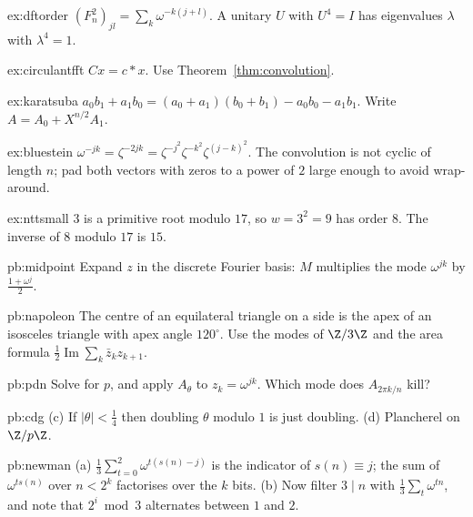 \begin{hint}{ex:dftorder}
$(F_n^2)_{jl}=\sum_k\omega^{-k(j+l)}$. A unitary $U$ with $U^4=I$ has eigenvalues $\lambda$ with $\lambda^4=1$.
\end{hint}
\begin{hint}{ex:circulantfft}
$Cx=c*x$. Use Theorem~\ref{thm:convolution}.
\end{hint}
\begin{hint}{ex:karatsuba}
$a_0b_1+a_1b_0=(a_0+a_1)(b_0+b_1)-a_0b_0-a_1b_1$. Write $A=A_0+X^{n/2}A_1$.
\end{hint}
\begin{hint}{ex:bluestein}
$\omega^{-jk}=\zeta^{-2jk}=\zeta^{-j^2}\zeta^{-k^2}\zeta^{(j-k)^2}$. The convolution is not cyclic of length $n$; pad both vectors with zeros to a power of $2$ large enough to avoid wrap-around.
\end{hint}
\begin{hint}{ex:nttsmall}
$3$ is a primitive root modulo $17$, so $w=3^2=9$ has order $8$. The inverse of $8$ modulo $17$ is $15$.
\end{hint}

\begin{hint}{pb:midpoint}
Expand $z$ in the discrete Fourier basis: $M$ multiplies the mode $\omega^{jk}$ by $\frac{1+\omega^j}2$.
\end{hint}

\begin{hint}{pb:napoleon}
The centre of an equilateral triangle on a side is the apex of an isosceles triangle with apex angle $120^\circ$. Use the
modes of $\Z/3\Z$ and the area formula $\frac12\operatorname{Im}\sum_k\bar z_kz_{k+1}$.
\end{hint}

\begin{hint}{pb:pdn}
Solve for $p$, and apply $A_\theta$ to $z_k=\omega^{jk}$. Which mode does $A_{2\pi k/n}$ kill?
\end{hint}

\begin{hint}{pb:cdg}
(c) If $|\theta|<\frac14$ then doubling $\theta$ modulo $1$ is just doubling. (d) Plancherel on $\Z/p\Z$.
\end{hint}

\begin{hint}{pb:newman}
(a) $\frac13\sum_{t=0}^2\omega^{t(s(n)-j)}$ is the indicator of $s(n)\equiv j$; the sum of $\omega^{ts(n)}$ over $n<2^k$ factorises over the $k$ bits.
(b) Now filter $3\mid n$ with $\frac13\sum_t\omega^{tn}$, and note that $2^i\bmod3$ alternates between $1$ and $2$.
\end{hint}

